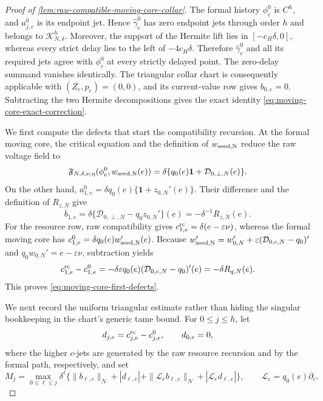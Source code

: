 \begin{proof}[Proof of \cref{lem:raw-compatible-moving-core-collar}]
The formal history \(\phi_e^0\) is \(C^h\), and
\(a_{j,e}^0\) is its endpoint jet.  Hence
\(\widehat\gamma_e^0\) has zero endpoint jets through order \(h\) and
belongs to \(\mathscr K_{N,\delta}^h\).  Moreover, the support of the
Hermite lift lies in \([-c_H\delta,0]\), whereas every strict delay lies
to the left of \(-4c_H\delta\).  Therefore \(\widehat\gamma_e^0\) and all
its required jets agree with \(\phi_e^0\) at every strictly delayed point.
The zero-delay summand vanishes identically.  The triangular collar chart
is consequently applicable with \((Z_e,p_e)=(0,0)\), and its current-value
row gives \(b_{0,e}=0\).  Subtracting the two Hermite decompositions gives
the exact identity \cref{eq:moving-core-exact-correction}.

We first compute the defects that start the compatibility recursion.  At
the formal moving core, the critical equation and the definition of
\(w_{\rm seed,N}\) reduce the raw voltage field to
\begin{equation}
 \mathfrak F_{N,\delta,\nu,\eta}
       (\phi_e^0,w_{\rm seed,N}(e))
 =\delta\{q_0(e)\mathbf1+\mathcal D_{0,\perp,N}(e)\}.         \label{eq:moving-core-raw-voltage-jet}
\end{equation}
On the other hand,
\(
 a_{1,e}^0=\delta q_0(e)\{\mathbf1+z_{0,N}'(e)\}
\).
Their difference and the definition of \(R_{z,N}\) give
\begin{equation*}
 b_{1,e}
 =\delta\{\mathcal D_{0,\perp,N}-q_0z_{0,N}'\}(e)
 =-\delta^{-1}R_{z,N}(e).
\end{equation*}
For the resource row, raw compatibility gives
\(
 c_{1,e}^{\rm rc}=\delta(e-\varepsilon\nu)
\), whereas the formal moving core has
\(
 c_{1,e}^{0}=\delta q_0(e)w_{\rm seed,N}'(e)
\).
Because
\(
 w_{\rm seed,N}'=w_{0,N}'
     +\varepsilon(\mathcal D_{0,c,N}-q_0)'
\)
and \(q_0w_{0,N}'=e-\varepsilon\nu\), subtraction yields
\begin{equation*}
 c_{1,e}^{\rm rc}-c_{1,e}^{0}
 =-\delta\varepsilon q_0(e)
       (\mathcal D_{0,c,N}-q_0)'(e)
 =-\delta R_{q,N}(e).
\end{equation*}
This proves \cref{eq:moving-core-first-defects}.

We next record the uniform triangular estimate rather than hiding the
singular bookkeeping in the chart's generic tame bound.  For
\(0\le j\le h\), let
\begin{equation*}
 d_{j,e}=c_{j,e}^{\rm rc}-c_{j,e}^0,
 \qquad d_{0,e}=0,
\end{equation*}
where the higher \(c\)-jets are generated by the raw resource recursion and
by the formal path, respectively, and set
\begin{equation*}
 M_j=\max_{0\le \ell\le j}\delta^\ell
 \{\|b_{\ell,e}\|_N+|d_{\ell,e}|
   +\|\mathcal L_eb_{\ell,e}\|_N
   +|\mathcal L_ed_{\ell,e}|\},
 \qquad \mathcal L_e=q_0(e)\partial_e.
\end{equation*}


\end{proof}
